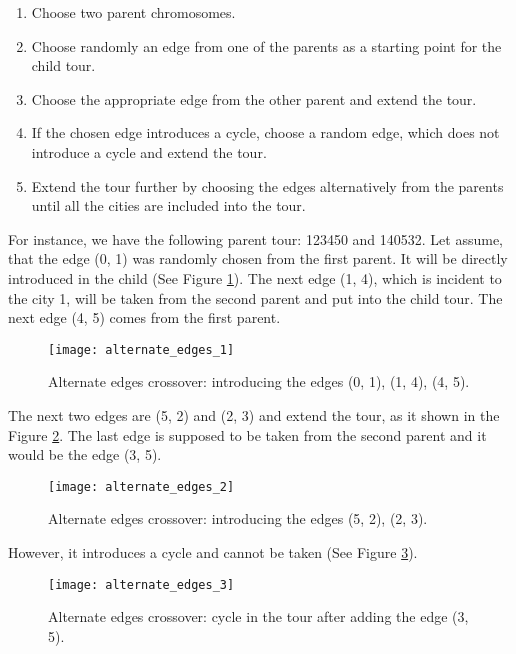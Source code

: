 \documentclass[a4paper, 12pt, headings=standardclasses]{scrartcl}
\begin{document}
\begin{enumerate}
	\item Choose two parent chromosomes.
	\item Choose randomly an edge from one of the parents as a starting point for the child tour.
	\item Choose the appropriate edge from the other parent and extend the tour.
	\item If the chosen edge introduces a cycle, choose a random edge, which does not introduce a cycle and extend the tour.
	\item Extend the tour further by choosing the edges alternatively from the parents until all the cities are included into the tour.	 
\end{enumerate}

For instance, we have the following parent tour: 123450 and 140532. Let assume, that the edge (0, 1) was randomly chosen from the first parent. It will be directly introduced in the child (See Figure \ref{alternate_edges_1}). The next edge (1, 4), which is incident to the city 1, will be taken from the second parent and put into the child tour. The next edge (4, 5) comes from the first parent. 

\begin{figure}[!ht]
	\centering
	\texttt{[image: alternate\_edges\_1]}
	\caption{Alternate edges crossover: introducing the edges (0, 1), (1, 4), (4, 5).}
	\label{alternate_edges_1}
\end{figure}

The next two edges are (5, 2) and (2, 3) and extend the tour, as it shown in the Figure \ref{alternate_edges_2}.
The last edge is supposed to be taken from the second parent and it would be the edge (3, 5). 

\begin{figure}[!ht]
	\centering
	\texttt{[image: alternate\_edges\_2]}
	\caption{Alternate edges crossover: introducing the edges (5, 2), (2, 3).}
	\label{alternate_edges_2}
\end{figure}

However, it introduces a cycle and cannot be taken (See Figure \ref{alternate_edges_3}).
 
\begin{figure}[!ht]
	\centering
	\texttt{[image: alternate\_edges\_3]}
	\caption{Alternate edges crossover: cycle in the tour after adding the edge (3, 5).}
	\label{alternate_edges_3}
\end{figure}
\end{document}
